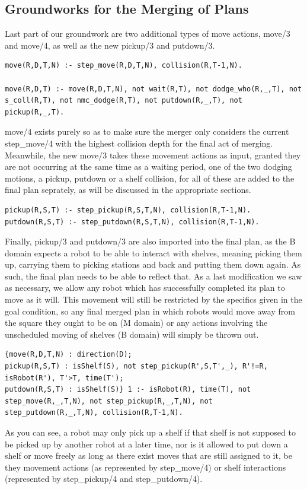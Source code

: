 \documentclass{llncs}
\begin{document}
\subsection{Groundworks for the Merging of Plans}
Last part of our groundwork are two additional types of move actions, move/3 and move/4, as well as the new pickup/3 and putdown/3.
\begin{lstlisting}[basicstyle=\fontsize{9}{11}\selectfont\ttfamily,frame=single,breaklines=true]
move(R,D,T,N) :- step_move(R,D,T,N), collision(R,T-1,N).

move(R,D,T) :- move(R,D,T,N), not wait(R,T), not dodge_who(R,_,T), not s_coll(R,T), not nmc_dodge(R,T), not putdown(R,_,T), not pickup(R,_,T).
\end{lstlisting}
move/4 exists purely so as to make sure the merger only considers the current step\_move/4 with the highest collision depth for the final act of merging. Meanwhile, the new move/3 takes these movement actions as input, granted they are not occurring at the same time as a waiting period, one of the two dodging motions, a pickup, putdown or a shelf collision, for all of these are added to the final plan seprately, as will be discussed in the appropriate sections.
\begin{lstlisting}[basicstyle=\fontsize{9}{11}\selectfont\ttfamily,frame=single,breaklines=true]
pickup(R,S,T) :- step_pickup(R,S,T,N), collision(R,T-1,N).
putdown(R,S,T) :- step_putdown(R,S,T,N), collision(R,T-1,N).
\end{lstlisting}
Finally, pickup/3 and putdown/3 are also imported into the final plan, as the B domain expects a robot to be able to interact with shelves, meaning picking them up, carrying them to picking stations and back and putting them down again. As such, the final plan needs to be able to reflect that.\newline\newline
As a last modification we saw as necessary, we allow any robot which has successfully completed its plan to move as it will. This movement will still be restricted by the specifics given in the goal condition, so any final merged plan in which robots would move away from the square they ought to be on (M domain) or any actions involving the unscheduled moving of shelves (B domain) will simply be thrown out.


\begin{lstlisting}[basicstyle=\fontsize{9}{11}\selectfont\ttfamily,frame=single,breaklines=true]
{move(R,D,T,N) : direction(D);
pickup(R,S,T) : isShelf(S), not step_pickup(R',S,T',_), R'!=R, isRobot(R'), T'>T, time(T');
putdown(R,S,T) : isShelf(S)} 1 :- isRobot(R), time(T), not step_move(R,_,T,N), not step_pickup(R,_,T,N), not step_putdown(R,_,T,N), collision(R,T-1,N).
\end{lstlisting}
As you can see, a robot may only pick up a shelf if that shelf is not supposed to be picked up by another robot at a later time, nor is it allowed to put down a shelf or move freely as long as there exist moves that are still assigned to it, be they movement actions (as represented by step\_move/4) or shelf interactions (represented by step\_pickup/4 and step\_putdown/4).
\end{document}
